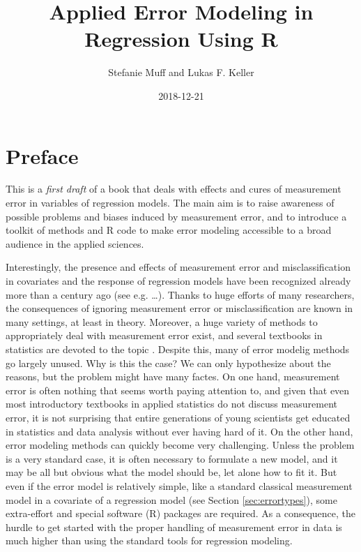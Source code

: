 \documentclass[]{book}
\title{Applied Error Modeling in Regression Using R}
\author{Stefanie Muff and Lukas F. Keller}
\date{2018-12-21}
\theoremstyle{definition}
\theoremstyle{definition}
\theoremstyle{definition}
\theoremstyle{remark}
\begin{document}
\maketitle

{
\setcounter{tocdepth}{1}
\tableofcontents
}
\chapter*{Preface}\label{preface}

This is a \emph{first draft} of a book that deals with effects and cures
of measurement error in variables of regression models. The main aim is
to raise awareness of possible problems and biases induced by
measurement error, and to introduce a toolkit of methods and R code to
make error modeling accessible to a broad audience in the applied
sciences.

Interestingly, the presence and effects of measurement error and
misclassification in covariates and the response of regression models
have been recognized already more than a century ago (see e.g.
\ldots{}). Thanks to huge efforts of many researchers, the consequences
of ignoring measurement error or misclassification are known in many
settings, at least in theory. Moreover, a huge variety of methods to
appropriately deal with measurement error exist, and several textbooks
in statistics are devoted to the topic
\citep{fuller1987, gustafson2004, carroll.etal2006, yi2017}. Despite
this, many of error modelig methods go largely unused. Why is this the
case? We can only hypothesize about the reasons, but the problem might
have many factes. On one hand, measurement error is often nothing that
seems worth paying attention to, and given that even most introductory
textbooks in applied statistics do not discuss measurement error, it is
not surprising that entire generations of young scientists get educated
in statistics and data analysis without ever having hard of it. On the
other hand, error modeling methods can quickly become very challenging.
Unless the problem is a very standard case, it is often necessary to
formulate a new model, and it may be all but obvious what the model
should be, let alone how to fit it. But even if the error model is
relatively simple, like a standard classical measurement model in a
covariate of a regression model (see Section \ref{sec:errortypes}), some
extra-effort and special software (R) packages are required. As a
consequence, the hurdle to get started with the proper handling of
measurement error in data is much higher than using the standard tools
for regression modeling.
\end{document}
